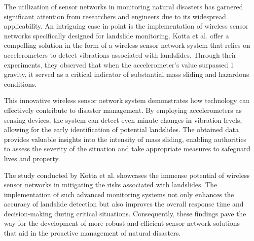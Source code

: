 \documentclass[conference]{IEEEtran}
\begin{document}
The utilization of sensor networks in monitoring natural disasters has garnered significant attention from
researchers and engineers due to its widespread applicability. An intriguing case in point is the implementation
of wireless sensor networks specifically designed for landslide monitoring. Kotta et al. \cite{b1} offer a
compelling solution in the form of a wireless sensor network system that relies on accelerometers to detect
vibrations associated with landslides. Through their experiments, they observed that when the accelerometer's
value surpassed 1 gravity, it served as a critical indicator of substantial mass sliding and hazardous
conditions.\par

This innovative wireless sensor network system demonstrates how technology can effectively contribute to
disaster management. By employing accelerometers as sensing devices, the system can detect even minute
changes in vibration levels, allowing for the early identification of potential landslides. The obtained
data provides valuable insights into the intensity of mass sliding, enabling authorities to assess the
severity of the situation and take appropriate measures to safeguard lives and property.\par

The study conducted by Kotta et al. \cite{b1} showcases the immense potential of wireless sensor networks
in mitigating the risks associated with landslides. The implementation of such advanced monitoring systems
not only enhances the accuracy of landslide detection but also improves the overall response time and
decision-making during critical situations. Consequently, these findings pave the way for the development
of more robust and efficient sensor network solutions that aid in the proactive management of natural
disasters.\par
\end{document}
